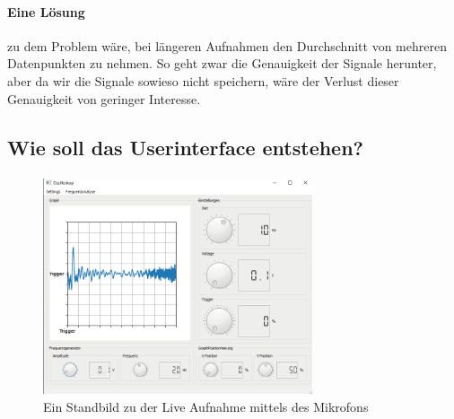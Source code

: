 \documentclass{article}
\begin{document}
\paragraph{Eine Lösung}
zu dem Problem wäre, bei längeren Aufnahmen den Durchschnitt von mehreren Datenpunkten zu nehmen. So geht zwar die Genauigkeit der Signale herunter, aber da wir die Signale sowieso nicht speichern, wäre der Verlust dieser Genauigkeit von geringer Interesse.

\subsection{Wie soll das Userinterface entstehen?}
\paragraph{}
\begin{figure}[H]
  \includegraphics[width=300]{"Oszilloskop_Mikrofon_Darstellung"}
  \caption[\textbf{OszilloskopMikrofonDarstellung.PNG},  Quelle: Screenshot eigenes Programm]
  {Ein Standbild zu der Live Aufnahme mittels des Mikrofons}
\end{figure}
\end{document}
